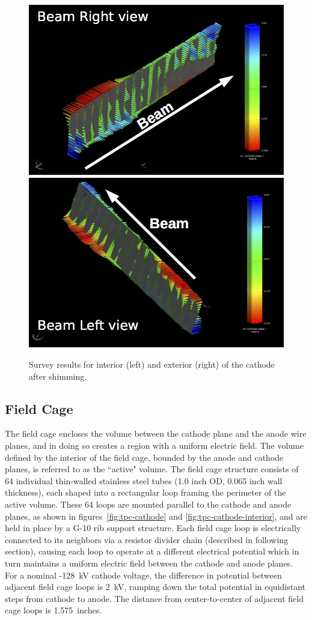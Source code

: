 \begin{figure}[htb]
\centering
\includegraphics[width=0.45\linewidth]{figures/cathode_right.jpg}
\includegraphics[width=0.45\linewidth]{figures/cathode_left.jpg}
\caption{Survey results for interior (left) and exterior (right) of the cathode after shimming.}
\label{fig:tpc-cathode-survey}
\end{figure}

\subsection{Field Cage}
The field cage encloses the volume between the cathode plane and the anode wire planes, and in doing so creates a region with a uniform electric field.  The volume defined by the interior of the field cage, bounded by the anode and cathode planes, is referred to as the ``active" volume.   The field cage structure consists of 64 individual thin-walled stainless steel tubes (1.0 inch OD, 0.065 inch wall thickness), each shaped into a rectangular loop framing the perimeter of the active volume. These 64 loops are mounted parallel to the cathode and anode planes, as shown in figures~\ref{fig:tpc-cathode} and \ref{fig:tpc-cathode-interior}, and are held in place by a G-10 rib support structure. Each field cage loop is electrically connected to its neighbors via a resistor divider chain (described in following section), causing each loop to operate at a different electrical potential which in turn maintains a uniform electric field between the cathode and anode planes. For a nominal -128~kV cathode voltage, the difference in potential between adjacent field cage loops is 2~kV, ramping down the total potential in equidistant steps from cathode to anode. The distance from center-to-center of adjacent field cage loops is 1.575~inches.

